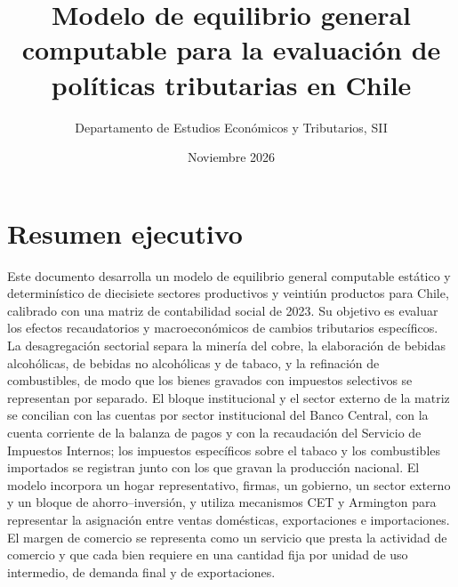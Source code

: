 \documentclass[11pt]{article}
\begin{document}
\title{Modelo de equilibrio general computable para la evaluación de políticas tributarias en Chile}
\author{Departamento de Estudios Económicos y Tributarios, SII}
\date{Noviembre 2026}
\maketitle

\section*{Resumen ejecutivo}

Este documento desarrolla un modelo de equilibrio general computable estático y determinístico de diecisiete sectores productivos y veintiún productos para Chile, calibrado con una matriz de contabilidad social de 2023. Su objetivo es evaluar los efectos recaudatorios y macroeconómicos de cambios tributarios específicos. La desagregación sectorial separa la minería del cobre, la elaboración de bebidas alcohólicas, de bebidas no alcohólicas y de tabaco, y la refinación de combustibles, de modo que los bienes gravados con impuestos selectivos se representan por separado. El bloque institucional y el sector externo de la matriz se concilian con las cuentas por sector institucional del Banco Central, con la cuenta corriente de la balanza de pagos y con la recaudación del Servicio de Impuestos Internos; los impuestos específicos sobre el tabaco y los combustibles importados se registran junto con los que gravan la producción nacional. El modelo incorpora un hogar representativo, firmas, un gobierno, un sector externo y un bloque de ahorro--inversión, y utiliza mecanismos CET y Armington para representar la asignación entre ventas domésticas, exportaciones e importaciones. El margen de comercio se representa como un servicio que presta la actividad de comercio y que cada bien requiere en una cantidad fija por unidad de uso intermedio, de demanda final y de exportaciones.
\end{document}
